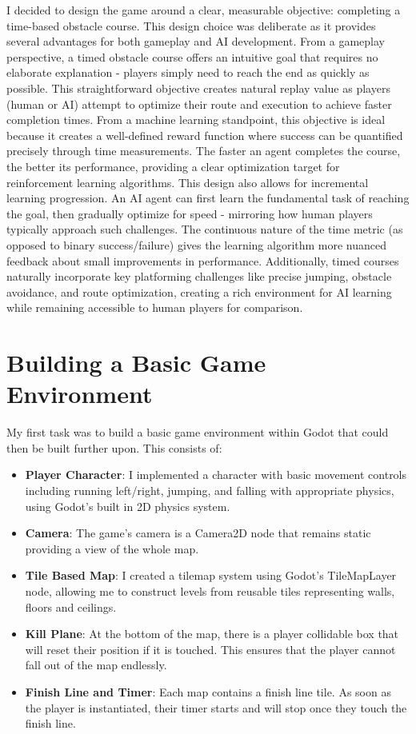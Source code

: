 I decided to design the game around a clear, measurable objective: completing a time-based obstacle course. This design choice was deliberate as it provides several advantages for both gameplay and AI development.
From a gameplay perspective, a timed obstacle course offers an intuitive goal that requires no elaborate explanation - players simply need to reach the end as quickly as possible. 
This straightforward objective creates natural replay value as players (human or AI) attempt to optimize their route and execution to achieve faster completion times.
From a machine learning standpoint, this objective is ideal because it creates a well-defined reward function where success can be quantified precisely through time measurements. 
The faster an agent completes the course, the better its performance, providing a clear optimization target for reinforcement learning algorithms.
This design also allows for incremental learning progression. An AI agent can first learn the fundamental task of reaching the goal, then gradually optimize for speed - mirroring how human players typically approach such challenges. 
The continuous nature of the time metric (as opposed to binary success/failure) gives the learning algorithm more nuanced feedback about small improvements in performance.
Additionally, timed courses naturally incorporate key platforming challenges like precise jumping, obstacle avoidance, and route optimization, creating a rich environment for AI learning while remaining accessible to human players for comparison.

\section{Building a Basic Game Environment}

My first task was to build a basic game environment within Godot that could then be built further upon.
This consists of:
\begin{itemize}
    \item \textbf{Player Character}: I implemented a character with basic movement controls including running left/right, jumping, and falling with appropriate physics, using Godot's built in 2D physics system.
    \item \textbf{Camera}: The game's camera is a Camera2D node that remains static providing a view of the whole map.
    \item \textbf{Tile Based Map}: I created a tilemap system using Godot's TileMapLayer node, allowing me to construct levels from reusable tiles representing walls, floors and ceilings.
    \item \textbf{Kill Plane}: At the bottom of the map, there is a player collidable box that will reset their position if it is touched. This ensures that the player cannot fall out of the map endlessly.
    \item \textbf{Finish Line and Timer}: Each map contains a finish line tile. As soon as the player is instantiated, their timer starts and will stop once they touch the finish line.
\end{itemize}

